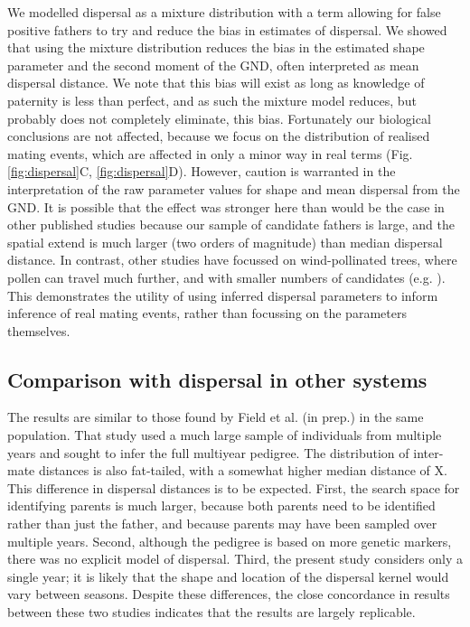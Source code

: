 \documentclass[10pt, a4paper, twocolumn]{article} %
\begin{document}
We modelled dispersal as a mixture distribution with a term allowing for false positive fathers to try and reduce the bias in estimates of dispersal.
We showed that using the mixture distribution reduces the bias in the estimated shape parameter and the second moment of the GND, often interpreted as mean dispersal distance.
We note that this bias will exist as long as knowledge of paternity is less than perfect, and as such the mixture model reduces, but probably does not completely eliminate, this bias. 
Fortunately our biological conclusions are not affected, because we focus on the distribution of realised mating events, which are affected in only a minor way in real terms (Fig. \ref{fig:dispersal}C, \ref{fig:dispersal}D).
However, caution is warranted in the interpretation of the raw parameter values for shape and mean dispersal from the GND.
It is possible that the effect was stronger here than would be the case in other published studies because our sample of candidate fathers is large, and the spatial extend is much larger (two orders of magnitude) than median dispersal distance.
In contrast, other studies have focussed on wind-pollinated trees, where pollen can travel much further, and with smaller numbers of candidates (e.g. \cite{adams1992using, austerlitz2004using, klein2008pollen}).
This demonstrates the utility of using inferred dispersal parameters to inform inference of real mating events, rather than focussing on the parameters themselves.

\subsection{Comparison with dispersal in other systems}

The results are similar to those found by Field et al. (in prep.) in the same population.
That study used a much large sample of individuals from multiple years and sought to infer the full multiyear pedigree.
The distribution of inter-mate distances is also fat-tailed, with a somewhat higher median distance of X.
This difference in dispersal distances is to be expected.
First, the search space for identifying parents is much larger, because both parents need to be identified rather than just the father, and because parents may have been sampled over multiple years.
Second, although the pedigree is based on more genetic markers, there was no explicit model of dispersal.
Third, the present study considers only a single year; it is likely that the shape and location of the dispersal kernel would vary between seasons.
Despite these differences, the close concordance in results between these two studies indicates that the results are largely replicable.
\end{document}
